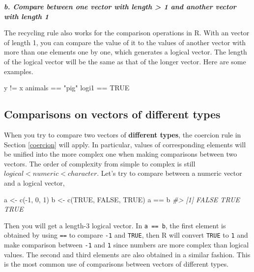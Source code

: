 \documentclass[
]{book}
\newenvironment{Shaded}{\begin{snugshade}}{\end{snugshade}}
\newcommand{\CommentTok}[1]{\textcolor[rgb]{0.56,0.35,0.01}{\textit{#1}}}
\newcommand{\ConstantTok}[1]{\textcolor[rgb]{0.00,0.00,0.00}{#1}}
\newcommand{\DecValTok}[1]{\textcolor[rgb]{0.00,0.00,0.81}{#1}}
\newcommand{\FunctionTok}[1]{\textcolor[rgb]{0.00,0.00,0.00}{#1}}
\newcommand{\NormalTok}[1]{#1}
\newcommand{\OtherTok}[1]{\textcolor[rgb]{0.56,0.35,0.01}{#1}}
\newcommand{\SpecialCharTok}[1]{\textcolor[rgb]{0.00,0.00,0.00}{#1}}
\newcommand{\StringTok}[1]{\textcolor[rgb]{0.31,0.60,0.02}{#1}}
\begin{document}
\textbf{\emph{b. Compare between one vector with length \textgreater{} 1 and another vector with length 1}}

The recycling rule also works for the comparison operations in R. With an vector of length 1, you can compare the value of it to the values of another vector with more than one elements one by one, which generates a logical vector. The length of the logical vector will be the same as that of the longer vector. Here are some examples.

\begin{Shaded}
\begin{Highlighting}[]
\NormalTok{y }\SpecialCharTok{!=}\NormalTok{ x}
\NormalTok{animals }\SpecialCharTok{==} \StringTok{"pig"}
\NormalTok{logi1 }\SpecialCharTok{==} \ConstantTok{TRUE}
\end{Highlighting}
\end{Shaded}

\hypertarget{comparisons-on-vectors-of-different-types}{%
\subsection{Comparisons on vectors of different types}\label{comparisons-on-vectors-of-different-types}}

When you try to compare two vectors of \textbf{different types}, the coercion rule in Section \ref{coercion} will apply. In particular, values of corresponding elements will be unified into the more complex one when making comparisons between two vectors. The order of complexity from simple to complex is still \(logical < numeric < character\). Let's try to compare between a numeric vector and a logical vector,

\begin{Shaded}
\begin{Highlighting}[]
\NormalTok{a }\OtherTok{\textless{}{-}} \FunctionTok{c}\NormalTok{(}\SpecialCharTok{{-}}\DecValTok{1}\NormalTok{, }\DecValTok{0}\NormalTok{, }\DecValTok{1}\NormalTok{)}
\NormalTok{b }\OtherTok{\textless{}{-}} \FunctionTok{c}\NormalTok{(}\ConstantTok{TRUE}\NormalTok{, }\ConstantTok{FALSE}\NormalTok{, }\ConstantTok{TRUE}\NormalTok{)}
\NormalTok{a }\SpecialCharTok{==}\NormalTok{ b}
\CommentTok{\#\textgreater{} [1] FALSE  TRUE  TRUE}
\end{Highlighting}
\end{Shaded}

Then you will get a length-3 logical vector. In \texttt{a\ ==\ b}, the first element is obtained by using \texttt{==} to compare \texttt{-1} and \texttt{TRUE}, then R will convert \texttt{TRUE} to \texttt{1} and make comparison between \texttt{-1} and \texttt{1} since numbers are more complex than logical values. The second and third elements are also obtained in a similar fashion. This is the most common use of comparisons between vectors of different types.
\end{document}
